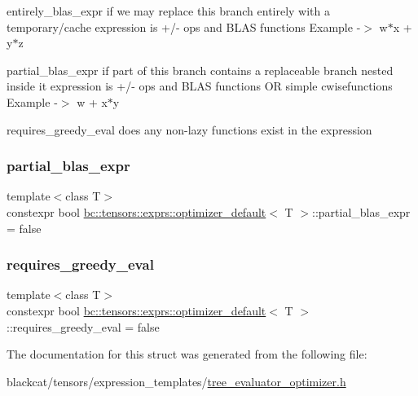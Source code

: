 entirely\+\_\+blas\+\_\+expr if we may replace this branch entirely with a temporary/cache expression is +/-\/ ops and B\+L\+AS functions Example -\/$>$ w$\ast$x + y$\ast$z 

partial\+\_\+blas\+\_\+expr if part of this branch contains a replaceable branch nested inside it expression is +/-\/ ops and B\+L\+AS functions OR simple cwisefunctions Example -\/$>$ w + x$\ast$y

requires\+\_\+greedy\+\_\+eval does any non-\/lazy functions exist in the expression \mbox{\label{structbc_1_1tensors_1_1exprs_1_1optimizer__default_aeab6375db3b27ee379b081b67bd62cf4}} 
\subsubsection{\texorpdfstring{partial\+\_\+blas\+\_\+expr}{partial\_blas\_expr}}
{\footnotesize\ttfamily template$<$class T$>$ \\
constexpr bool \hyperlink{structbc_1_1tensors_1_1exprs_1_1optimizer__default}{bc\+::tensors\+::exprs\+::optimizer\+\_\+default}$<$ T $>$\+::partial\+\_\+blas\+\_\+expr = false\hspace{0.3cm}{\ttfamily [static]}}

\mbox{\label{structbc_1_1tensors_1_1exprs_1_1optimizer__default_af5e1f7d26972ce361a83e4b61319c1e4}} 
\subsubsection{\texorpdfstring{requires\+\_\+greedy\+\_\+eval}{requires\_greedy\_eval}}
{\footnotesize\ttfamily template$<$class T$>$ \\
constexpr bool \hyperlink{structbc_1_1tensors_1_1exprs_1_1optimizer__default}{bc\+::tensors\+::exprs\+::optimizer\+\_\+default}$<$ T $>$\+::requires\+\_\+greedy\+\_\+eval = false\hspace{0.3cm}{\ttfamily [static]}}



The documentation for this struct was generated from the following file\+:\begin{DoxyCompactItemize}
\item 
blackcat/tensors/expression\+\_\+templates/\hyperlink{tree__evaluator__optimizer_8h}{tree\+\_\+evaluator\+\_\+optimizer.\+h}\end{DoxyCompactItemize}

